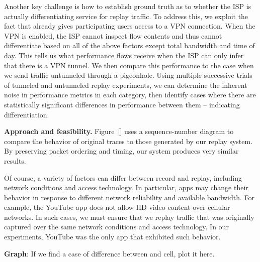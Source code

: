 Another key challenge is how to establish ground truth as to whether the ISP is 
actually differentiating service for replay traffic. To address this, we exploit the fact 
that \meddle already gives participating users access to a VPN connection. When the 
VPN is enabled, the ISP cannot inspect flow contents and thus cannot differentiate based 
on all of the above factors except total bandwidth and time of day. This tells us what 
performance flows receive when the ISP can only infer that there is a VPN tunnel. 
We then compare this performance to the case when we send traffic untunneled through a 
pigeonhole. Using multiple successive trials of tunneled and untunneled replay experiments, 
we can determine the inherent noise in performance metrics in each category, then 
identify cases where there are statistically significant differences in performance between 
them -- indicating differentiation. 





\noindent\textbf{Approach and feasibility.}
Figure~\ref{} uses a sequence-number diagram to compare the behavior of original traces 
to those generated by our replay system. By preserving packet ordering and timing, our 
system produces very similar results. 

Of course, a variety of factors can differ between record and replay, including network 
conditions and access technology. In particular, apps may change their behavior in response 
to different network reliability and available bandwidth. For example, the YouTube app does not 
allow HD video content over cellular networks. In such cases, we must ensure that we replay 
traffic that was originally captured over the same network conditions and access technology. 
In our experiments, YouTube was the only app that exhibited such behavior.


\textbf{Graph}: If we find a case of difference between \wifi and cell, plot it here.



